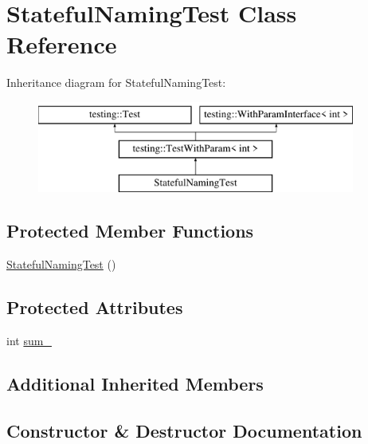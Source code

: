 \hypertarget{classStatefulNamingTest}{}\section{Stateful\+Naming\+Test Class Reference}
\label{classStatefulNamingTest}
Inheritance diagram for Stateful\+Naming\+Test\+:\begin{figure}[H]
\begin{center}
\leavevmode
\includegraphics[height=3.000000cm]{classStatefulNamingTest}
\end{center}
\end{figure}
\subsection*{Protected Member Functions}
\begin{DoxyCompactItemize}
\item 
\mbox{\hyperlink{classStatefulNamingTest_a49ae5e642d5dab937d8a167ac197d6fd}{Stateful\+Naming\+Test}} ()
\end{DoxyCompactItemize}
\subsection*{Protected Attributes}
\begin{DoxyCompactItemize}
\item 
int \mbox{\hyperlink{classStatefulNamingTest_ad719a1c2919c304bfe840313142a376a}{sum\+\_\+}}
\end{DoxyCompactItemize}
\subsection*{Additional Inherited Members}


\subsection{Constructor \& Destructor Documentation}
\mbox{\label{classStatefulNamingTest_a49ae5e642d5dab937d8a167ac197d6fd}} 
